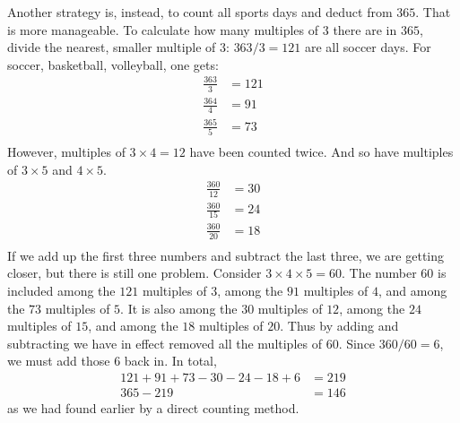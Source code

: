 \documentclass[12pt]{article}
\begin{document}
Another strategy is, instead, to count all sports days and deduct from $365$. That is more manageable. To calculate how many multiples of $3$ there are in $365$, divide the nearest, smaller multiple of $3$: $363/3=121$ are all soccer days. For soccer, basketball, volleyball, one gets:
\begin{align*}
\frac{363}{3} & = 121 \\
\frac{364}{4} & = 91 \\
\frac{365}{5} & = 73 \\
\end{align*}
However, multiples of $3 \times 4=12$ have been counted twice. And so have multiples of $3 \times 5$ and $4 \times 5$. 
\begin{align*}
\frac{360}{12} & = 30 \\
\frac{360}{15} & = 24 \\
\frac{360}{20} & = 18 \\
\end{align*}
If we add up the first three numbers and subtract the last three, we are getting closer, but there is still one problem. Consider $3 \times 4 \times 5=60$. The number $60$ is included among the $121$ multiples of $3$, among the $91$ multiples of $4$, and among the $73$ multiples of $5$. It is also among the $30$ multiples of $12$, among the $24$ multiples of $15$, and among the $18$ multiples of $20$. Thus by adding and subtracting we have in effect removed all the multiples of $60$. Since $360/60=6$, we must add those $6$ back in. In total,
\begin{align*}
121 + 91 + 73 - 30 - 24 - 18 + 6 & = 219 \\
365 - 219 & = 146
\end{align*}
as we had found earlier by a direct counting method.




\newpage
\end{document}
